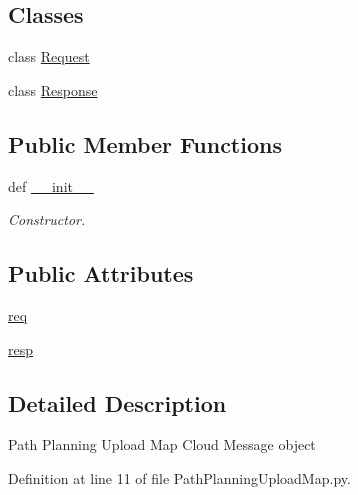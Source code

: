 \subsection*{Classes}
\begin{DoxyCompactItemize}
\item 
class \hyperlink{classRappCloud_1_1CloudMsgs_1_1PathPlanningUploadMap_1_1PathPlanningUploadMap_1_1Request}{Request}
\item 
class \hyperlink{classRappCloud_1_1CloudMsgs_1_1PathPlanningUploadMap_1_1PathPlanningUploadMap_1_1Response}{Response}
\end{DoxyCompactItemize}
\subsection*{Public Member Functions}
\begin{DoxyCompactItemize}
\item 
def \hyperlink{classRappCloud_1_1CloudMsgs_1_1PathPlanningUploadMap_1_1PathPlanningUploadMap_aa529ab0691cec243e64f331112718bff}{\-\_\-\-\_\-init\-\_\-\-\_\-}
\begin{DoxyCompactList}\small\item\em Constructor. \end{DoxyCompactList}\end{DoxyCompactItemize}
\subsection*{Public Attributes}
\begin{DoxyCompactItemize}
\item 
\hyperlink{classRappCloud_1_1CloudMsgs_1_1PathPlanningUploadMap_1_1PathPlanningUploadMap_ac239cfaccab859b62ec50d0814e9a0ca}{req}
\item 
\hyperlink{classRappCloud_1_1CloudMsgs_1_1PathPlanningUploadMap_1_1PathPlanningUploadMap_a2047647bd04b9d19a2079d327e92214a}{resp}
\end{DoxyCompactItemize}


\subsection{Detailed Description}
\begin{DoxyVerb}Path Planning Upload Map Cloud Message object\end{DoxyVerb}
 

Definition at line 11 of file Path\-Planning\-Upload\-Map.\-py.



